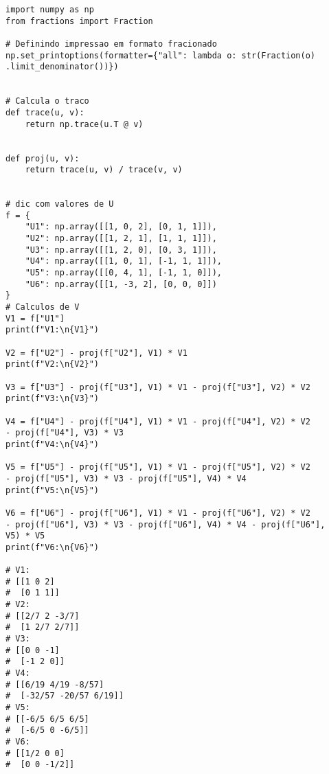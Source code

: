 \begin{lstlisting}
import numpy as np
from fractions import Fraction
    
# Definindo impressao em formato fracionado
np.set_printoptions(formatter={"all": lambda o: str(Fraction(o)
.limit_denominator())})
    
    
# Calcula o traco
def trace(u, v):
    return np.trace(u.T @ v)
    
    
def proj(u, v):
    return trace(u, v) / trace(v, v)
    
    
# dic com valores de U
f = {
    "U1": np.array([[1, 0, 2], [0, 1, 1]]),
    "U2": np.array([[1, 2, 1], [1, 1, 1]]),
    "U3": np.array([[1, 2, 0], [0, 3, 1]]),
    "U4": np.array([[1, 0, 1], [-1, 1, 1]]),
    "U5": np.array([[0, 4, 1], [-1, 1, 0]]),
    "U6": np.array([[1, -3, 2], [0, 0, 0]])
}
# Calculos de V
V1 = f["U1"]
print(f"V1:\n{V1}")
    
V2 = f["U2"] - proj(f["U2"], V1) * V1
print(f"V2:\n{V2}")
    
V3 = f["U3"] - proj(f["U3"], V1) * V1 - proj(f["U3"], V2) * V2
print(f"V3:\n{V3}")
    
V4 = f["U4"] - proj(f["U4"], V1) * V1 - proj(f["U4"], V2) * V2 
- proj(f["U4"], V3) * V3
print(f"V4:\n{V4}")
    
V5 = f["U5"] - proj(f["U5"], V1) * V1 - proj(f["U5"], V2) * V2 
- proj(f["U5"], V3) * V3 - proj(f["U5"], V4) * V4
print(f"V5:\n{V5}")
    
V6 = f["U6"] - proj(f["U6"], V1) * V1 - proj(f["U6"], V2) * V2 
- proj(f["U6"], V3) * V3 - proj(f["U6"], V4) * V4 - proj(f["U6"], 
V5) * V5
print(f"V6:\n{V6}")
    
# V1:
# [[1 0 2]
#  [0 1 1]]
# V2:
# [[2/7 2 -3/7]
#  [1 2/7 2/7]]
# V3:
# [[0 0 -1]
#  [-1 2 0]]
# V4:
# [[6/19 4/19 -8/57]
#  [-32/57 -20/57 6/19]]
# V5:
# [[-6/5 6/5 6/5]
#  [-6/5 0 -6/5]]
# V6:
# [[1/2 0 0]
#  [0 0 -1/2]]
\end{lstlisting}
